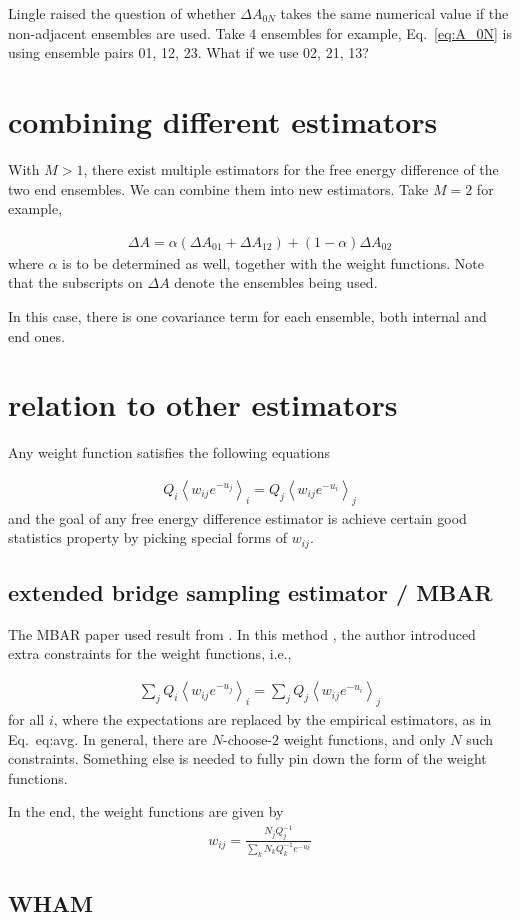 \documentclass[notitlepage, amsmath, amssymb, aps]{revtex4-1}
\begin{document}
Lingle raised the question of whether $\Delta A_{0N}$ takes the same numerical value if the non-adjacent ensembles are used.
Take 4 ensembles for example, Eq.~\ref{eq:A_0N} is using ensemble pairs 01, 12, 23.
What if we use 02, 21, 13?

\section{combining different estimators} \label{sec:combine}

With $M>1$, there exist multiple estimators for the free energy difference of the two end ensembles.
We can combine them into new estimators.
Take $M=2$ for example,

\begin{align}
    \Delta A = \alpha (\Delta A_{01} + \Delta A_{12}) + (1-\alpha)\Delta A_{02}
\end{align}
where $\alpha$ is to be determined as well, together with the weight functions.
Note that the subscripts on $\Delta A$ denote the ensembles being used.

In this case, there is one covariance term for each ensemble, both internal and end ones.


\section{relation to other estimators}

Any weight function satisfies the following equations

\begin{align}
    Q_i\left< w_{ij}e^{-u_j}\right>_i = Q_j\left<w_{ij}e^{-u_i} \right>_j
\end{align}
and the goal of any free energy difference estimator is achieve certain good
statistics property by picking special forms of $w_{ij}$.

\subsection{extended bridge sampling estimator / MBAR}

The MBAR paper \cite{shirts08} used result from \cite{tan04}.
In this method \cite{tan04}, the author introduced extra constraints for the weight functions, i.e.,

\begin{align}
    \sum_j Q_i\left< w_{ij}e^{-u_j}\right>_i = \sum_j Q_j\left<w_{ij}e^{-u_i} \right>_j
\end{align}
for all $i$, where the expectations are replaced by the empirical estimators, as in Eq.~{eq:avg}.
In general, there are $N$-choose-$2$ weight functions, and only $N$ such constraints.
Something else is needed to fully pin down the form of the weight functions.

In the end, the weight functions are given by
\begin{align}
    w_{ij} = \frac{N_j Q_j^{-1}}{\sum_k N_k Q_k^{-1}e^{-u_k}}
\end{align}

\subsection{WHAM}


\end{document}
